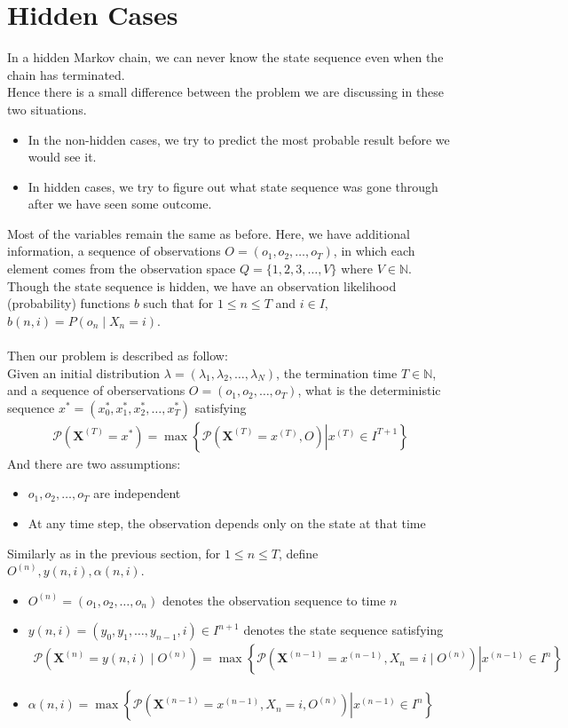 \documentclass{article}
\begin{document}
\section{Hidden Cases}
In a hidden Markov chain, we can never know the state sequence even when the chain has terminated. \\
Hence there is a small difference between the problem we are discussing in these two situations.
\begin{itemize}
    \item In the non-hidden cases, we try to predict the most probable result before we would see it.
    \item In hidden cases, we try to figure out what state sequence was gone through after we have seen some outcome.
\end{itemize}
Most of the variables remain the same as before. Here, we have additional information, a sequence of observations $O=(o_1,o_2,\dotsc,o_T)$, 
in which each element comes from the observation space $Q=\{1,2,3,\dotsc,V\}$ where $V\in\mathbb{N}$. \\
Though the state sequence is hidden, we have an observation likelihood (probability) functions $b$ such that for $1\leq n\leq T$ and $i\in I$, $b(n,i)=P(o_n\mid X_n=i)$. \\
\\
Then our problem is described as follow:\\
Given an initial distribution $\lambda=(\lambda_1,\lambda_2,\dotsc,\lambda_N)$, the termination time $T\in \mathbb{N}$, 
and a sequence of oberservations $O=(o_1,o_2,\dotsc,o_T)$, what is the deterministic sequence $x^*=(x^*_0,x^*_1,x^*_2,\dotsc,x^*_T)$ satisfying
\begin{align}\label{eq:5}
    \mathcal{P}(\mathbf{X}^{(T)}=x^*) = \max \left\{\left.\mathcal{P}\left(\mathbf{X}^{(T)}=x^{(T)}, O\right)\right| x^{(T)}\in I^{T+1}\right\}
\end{align}
And there are two assumptions:
\begin{itemize}
    \item $o_1,o_2,\dotsc,o_T$ are independent
    \item At any time step, the observation depends only on the state at that time
\end{itemize}
$ $\\
Similarly as in the previous section, for $1\leq n\leq T$, define $O^{(n)},y(n,i),\alpha(n,i)$.
\begin{itemize}
    \item $O^{(n)}=(o_1,o_2,\dotsc,o_n)$ denotes the observation sequence to time $n$
    \item $y(n,i)=(y_0,y_1,\dotsc,y_{n-1},i)\in I^{n+1}$ denotes the state sequence satisfying
    \begin{align}
        \mathcal{P}\left(\mathbf{X}^{(n)}=y(n,i)\mid O^{(n)}\right) = \max\left\{\left.\mathcal{P}\left(\mathbf{X}^{(n-1)}=x^{(n-1)}, X_n=i\mid O^{(n)}\right)\right| x^{(n-1)}\in I^{n}\right\} \label{eq:6}
    \end{align}
    \item $\alpha(n,i) = \max\left\{\left.\mathcal{P}\left(\mathbf{X}^{(n-1)}=x^{(n-1)}, X_n=i, O^{(n)}\right)\right| x^{(n-1)}\in I^{n}\right\}$
\end{itemize}
\end{document}
